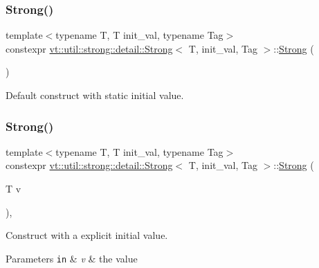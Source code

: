 \subsubsection{\texorpdfstring{Strong()}{Strong()}\hspace{0.1cm}{\footnotesize\ttfamily [1/2]}}
{\footnotesize\ttfamily template$<$typename T, T init\+\_\+val, typename Tag$>$ \\
constexpr \hyperlink{structvt_1_1util_1_1strong_1_1detail_1_1_strong}{vt\+::util\+::strong\+::detail\+::\+Strong}$<$ T, init\+\_\+val, Tag $>$\+::\hyperlink{structvt_1_1util_1_1strong_1_1detail_1_1_strong}{Strong} (\begin{DoxyParamCaption}{ }\end{DoxyParamCaption})\hspace{0.3cm}{\ttfamily [default]}}



Default construct with static initial value. 

\mbox{\label{structvt_1_1util_1_1strong_1_1detail_1_1_strong_a25fead6e8aff403d57fa5a4718e3a0ef}} 
\subsubsection{\texorpdfstring{Strong()}{Strong()}\hspace{0.1cm}{\footnotesize\ttfamily [2/2]}}
{\footnotesize\ttfamily template$<$typename T, T init\+\_\+val, typename Tag$>$ \\
constexpr \hyperlink{structvt_1_1util_1_1strong_1_1detail_1_1_strong}{vt\+::util\+::strong\+::detail\+::\+Strong}$<$ T, init\+\_\+val, Tag $>$\+::\hyperlink{structvt_1_1util_1_1strong_1_1detail_1_1_strong}{Strong} (\begin{DoxyParamCaption}\item[{T}]{v }\end{DoxyParamCaption})\hspace{0.3cm}{\ttfamily [inline]}, {\ttfamily [explicit]}}



Construct with a explicit initial value. 


\begin{DoxyParams}[1]{Parameters}
\mbox{\tt in}  & {\em v} & the value \\
\hline
\end{DoxyParams}


